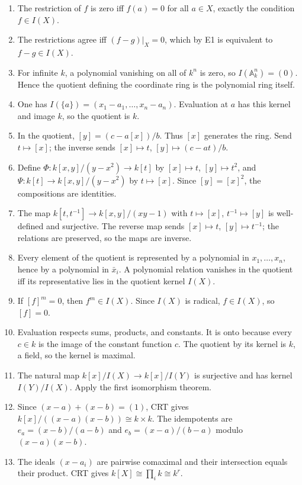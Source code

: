 \begin{enumerate}[label=\textbf{E\arabic*.},leftmargin=*]
\item The restriction of \(f\) is zero iff \(f(a)=0\) for all \(a\in X\), exactly the condition \(f\in I(X)\).
\item The restrictions agree iff \((f-g)|_X=0\), which by E1 is equivalent to \(f-g\in I(X)\).
\item For infinite \(k\), a polynomial vanishing on all of \(k^n\) is zero, so \(I(\mathbb A_k^n)=(0)\).  Hence the quotient defining the coordinate ring is the polynomial ring itself.
\item One has \(I(\{a\})=(x_1-a_1,\dots,x_n-a_n)\).  Evaluation at \(a\) has this kernel and image \(k\), so the quotient is \(k\).
\item In the quotient, \([y]=(c-a[x])/b\).  Thus \([x]\) generates the ring.  Send \(t\mapsto[x]\); the inverse sends \([x]\mapsto t\), \([y]\mapsto(c-at)/b\).
\item Define \(\Phi:k[x,y]/(y-x^2)\to k[t]\) by \([x]\mapsto t\), \([y]\mapsto t^2\), and \(\Psi:k[t]\to k[x,y]/(y-x^2)\) by \(t\mapsto[x]\).  Since \([y]=[x]^2\), the compositions are identities.
\item The map \(k[t,t^{-1}]\to k[x,y]/(xy-1)\) with \(t\mapsto[x]\), \(t^{-1}\mapsto[y]\) is well-defined and surjective.  The reverse map sends \([x]\mapsto t\), \([y]\mapsto t^{-1}\); the relations are preserved, so the maps are inverse.
\item Every element of the quotient is represented by a polynomial in \(x_1,\dots,x_n\), hence by a polynomial in \(\bar x_i\).  A polynomial relation vanishes in the quotient iff its representative lies in the quotient kernel \(I(X)\).
\item If \([f]^m=0\), then \(f^m\in I(X)\).  Since \(I(X)\) is radical, \(f\in I(X)\), so \([f]=0\).
\item Evaluation respects sums, products, and constants.  It is onto because every \(c\in k\) is the image of the constant function \(c\).  The quotient by its kernel is \(k\), a field, so the kernel is maximal.
\item The natural map \(k[x]/I(X)\to k[x]/I(Y)\) is surjective and has kernel \(I(Y)/I(X)\).  Apply the first isomorphism theorem.
\item Since \((x-a)+(x-b)=(1)\), CRT gives \(k[x]/((x-a)(x-b))\cong k\times k\).  The idempotents are \(e_a=(x-b)/(a-b)\) and \(e_b=(x-a)/(b-a)\) modulo \((x-a)(x-b)\).
\item The ideals \((x-a_i)\) are pairwise comaximal and their intersection equals their product.  CRT gives \(k[X]\cong\prod_i k\cong k^r\).

\end{enumerate}
